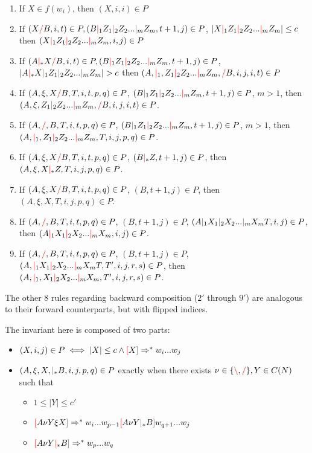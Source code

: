 \documentclass[main.tex]{subfiles}
\begin{document}
\begin{enumerate}
    \item If $X \in f(w_i)$, then $(X, i, i) \in P$
    \item If $(X \textcolor{red}{/} B, i, t) \in P, (B \textcolor{red}{|}_1 Z_1 \textcolor{red}{|}_2 Z_2 ... \textcolor{red}{|}_m Z_m, t + 1, j) \in P$,
        $|X \textcolor{red}{|}_1 Z_1 \textcolor{red}{|}_2 Z_2 ... \textcolor{red}{|}_m Z_m| \leq c$
        then $(X \textcolor{red}{|}_1 Z_1 \textcolor{red}{|}_2 Z_2 ... \textcolor{red}{|}_m Z_m, i, j) \in P$
    \item If $(A \textcolor{red}{|}_* X \textcolor{red}{/} B, i, t) \in P, (B \textcolor{red}{|}_1 Z_1 \textcolor{red}{|}_2 Z_2 ... \textcolor{red}{|}_m Z_m, t + 1, j) \in P$,
        $|A \textcolor{red}{|}_* X \textcolor{red}{|}_1 Z_1 \textcolor{red}{|}_2 Z_2 ... \textcolor{red}{|}_m Z_m| > c$
        then $(A, \textcolor{red}{|}_1, Z_1 \textcolor{red}{|}_2 Z_2 ... \textcolor{red}{|}_m Z_m, \textcolor{red}{/} B, i, j, i, t) \in P$
    \item If $(A, \xi, X \textcolor{red}{/} B, T, i, t, p, q) \in P$,
        $(B \textcolor{red}{|}_1 Z_1 \textcolor{red}{|}_2 Z_2 ... \textcolor{red}{|}_m Z_m, t + 1, j) \in P$,
        $m > 1$, then $(A, \xi, Z_1 \textcolor{red}{|}_2 Z_2 ... \textcolor{red}{|}_m Z_m, \textcolor{red}{/} B, i, j, i, t) \in P$.
    \item If $(A, \textcolor{red}{/}, B, T, i, t, p, q) \in P$,
        $(B \textcolor{red}{|}_1 Z_1 \textcolor{red}{|}_2 Z_2 ... \textcolor{red}{|}_m Z_m, t + 1, j) \in P$,
        $m > 1$, then $(A, \textcolor{red}{|}_1, Z_1 \textcolor{red}{|}_2 Z_2 ... \textcolor{red}{|}_m Z_m, T, i, j, p, q) \in P$.
    \item If $(A, \xi, X \textcolor{red}{/} B, T, i, t, p, q) \in P$,
        $(B \textcolor{red}{|}_* Z, t + 1, j) \in P$,
        then $(A, \xi, X \textcolor{red}{|}_* Z, T, i, j, p, q) \in P$.
    \item If $(A, \xi, X \textcolor{red}{/} B, T, i, t, p, q) \in P$,
        $(B, t + 1, j) \in P$,
        then $(A, \xi, X, T, i, j, p, q) \in P$.
    \item If $(A, \textcolor{red}{/}, B, T, i, t, p, q) \in P$,
        $(B, t + 1, j) \in P$, $(A \textcolor{red}{|}_1 X_1 \textcolor{red}{|}_2 X_2 ... \textcolor{red}{|}_m X_m T, i, j) \in P$,
        then $(A \textcolor{red}{|}_1 X_1 \textcolor{red}{|}_2 X_2 ... \textcolor{red}{|}_m X_m, i, j) \in P$.
    \item If $(A, \textcolor{red}{/}, B, T, i, t, p, q) \in P$,
        $(B, t + 1, j) \in P$, $(A, \textcolor{red}{|}_1 X_1 \textcolor{red}{|}_2 X_2 ... \textcolor{red}{|}_m X_m T, T', i, j, r, s) \in P$,
        then $(A, \textcolor{red}{|}_1, X_1 \textcolor{red}{|}_2 X_2 ... \textcolor{red}{|}_m X_m, T', i, j, r, s) \in P$.
\end{enumerate}

The other 8 rules regarding backward composition
($2'$ through $9'$) are analogous to their forward counterparts, but with
flipped indices.

The invariant here is composed of two parts:

\begin{itemize}
    \item $(X, i, j) \in P \iff |X| \leq c \land \textcolor{red}{[} X \textcolor{red}{]} \Rightarrow^* w_i ... w_j$
    \item $(A, \xi, X, \textcolor{red}{|}_* B, i, j, p, q) \in P$
        exactly when there exists $\nu \in \{ \textcolor{red}{\backslash}, \textcolor{red}{/} \}, Y \in C(N)$ such that
        \begin{itemize}
            \item $1 \leq |Y| \leq c'$
            \item $\textcolor{red}{[} A \nu Y \xi X \textcolor{red}{]} \Rightarrow^* w_i ... w_{p - 1} \textcolor{red}{[} A \nu Y \textcolor{red}{|}_* B \textcolor{red}{]} w_{q + 1} ... w_j$
            \item $\textcolor{red}{[} A \nu Y \textcolor{red}{|}_* B \textcolor{red}{]} \Rightarrow^* w_p ... w_q$
        \end{itemize}
\end{itemize}
\end{document}
